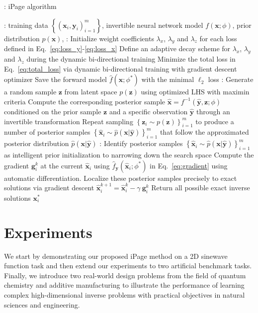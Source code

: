\documentclass[letterpaper]{article}
\begin{document}
\begin{algorithm}[h!]\label{algo:1}
\footnotesize
  \caption{\hspace{-0.1cm}: iPage algorithm}
\begin{algorithmic}[1]
: training data $\left\{(\mathbf{x}_i, \mathbf{y}_i)_{i=1}^m \right\}$, invertible neural network model $f(\mathbf{x};\phi)$, prior distribution $p(\mathbf{x})$,
:
\STATE Initialize weight coefficients $\lambda_x$, $\lambda_y$ and $\lambda_z$  for each loss defined in Eq.~\eqref{eq:loss_y}-\eqref{eq:loss_x}
\STATE Define an adaptive decay scheme for $\lambda_x$, $\lambda_y$ and $\lambda_z$ during the dynamic bi-directional training
\STATE Minimize the total loss in Eq.~\eqref{eq:total_loss} via dynamic bi-directional training with gradient descent optimizer
\STATE Save the forward model $\hat{f}(\mathbf{x}; \phi^*)$ with the minimal $\ell_2$ loss
:
\STATE Generate a random sample $\mathbf{z}$ from latent space $p(\mathbf z)$ using optimized LHS with maximin criteria
\STATE Compute the corresponding posterior sample $\hat{\mathbf{x}} = f^{-1}(\hat{\mathbf{y}}, \mathbf{z}; \phi)$ conditioned on the prior sample $\mathbf z$ and a specific observation $\hat{\mathbf{y}}$ through an invertible transformation
\STATE Repeat sampling $\left\{\mathbf{z}_i \sim p(\mathbf{z}) \right\}_{i=1}^m$ to produce a number of posterior samples $\left\{\hat{\mathbf{x}}_i \sim \hat{p}({\mathbf{x}} | \hat{\mathbf{y}}) \right\}_{i=1}^m$ that follow the approximated posterior distribution $\hat{p}(\mathbf{x} | \hat{\mathbf{y}})$
:
\STATE Identify posterior samples $\left\{\hat{\mathbf{x}}_i \sim \hat{p}({\mathbf{x}} | \hat{\mathbf{y}}) \right\}_{i=1}^m$ as intelligent prior initialization to narrowing down the search space
\STATE Compute the gradient $\mathbf{g}_i^{k}$ at the current $\hat{\mathbf{x}}_i$ using $\hat{f}_{\mathbf{y}}(\hat{\mathbf{x}}_i;{\phi}^*)$ in Eq.~\eqref{eq:gradient} using automatic differentiation.
\STATE Localize these posterior samples precisely to exact solutions via gradient descent $\hat{\mathbf{x}}_{i}^{k+1} = \hat{\mathbf{x}}_i^{k} -\gamma ~ \mathbf{g}_i^{k}$
\STATE Return all possible exact inverse solutions $\mathbf{x}_i^{*}$
\end{algorithmic}
\end{algorithm}

\section{Experiments}
We start by demonstrating our proposed iPage method on a 2D sinewave function task and then extend our experiments to two artificial benchmark tasks. Finally, we introduce two real-world design problems from the field of quantum chemistry and additive manufacturing to illustrate the performance of learning complex high-dimensional inverse problems with practical objectives in natural sciences and engineering.
\end{document}
